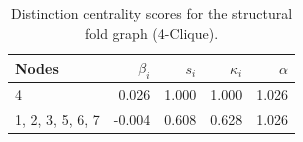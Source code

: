 \begin{table}
\centering
\caption{\label{tab:sf4}Distinction centrality scores for the structural fold graph (4-Clique).}
\centering
\begin{tabular}[t]{lrrrr}
\toprule
Nodes & $\beta_i$ & $s_i$ & $\kappa_i$ & $\alpha$\\
\midrule
4 & 0.026 & 1.000 & 1.000 & 1.026\\
1, 2, 3, 5, 6, 7 & -0.004 & 0.608 & 0.628 & 1.026\\
\bottomrule
\end{tabular}
\end{table}

